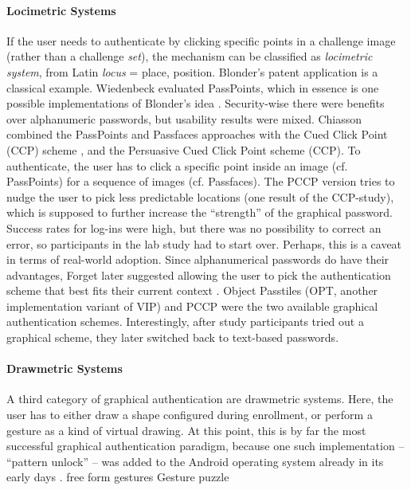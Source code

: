 	\paragraph{Locimetric Systems}
	If the user needs to authenticate by clicking specific points in a challenge image (rather than a challenge \textit{set}), the mechanism can be classified as \textit{locimetric system}, from Latin \textit{locus} = place, position. Blonder's patent application \cite{Blonder1996PatentGraphicalPW} is a classical example. Wiedenbeck \etal evaluated PassPoints, which in essence is one possible implementations of Blonder's idea \cite{Wiedenbeck2005PassPoints}. Security-wise there were benefits over alphanumeric passwords, but usability results were mixed. Chiasson \etal combined the PassPoints and Passfaces approaches with the Cued Click Point (CCP) scheme \cite{Chiasson2007CCP}, and the Persuasive Cued Click Point scheme \cite{Chiasson2008PCCP} (CCP). To authenticate, the user has to click a specific point inside an image (cf. PassPoints) for a sequence of images (cf. Passfaces). The PCCP version tries to nudge the user to pick less predictable locations (one result of the CCP-study), which is supposed to further increase the ``strength'' of the graphical password. Success rates for log-ins were high, but there was no possibility to correct an error, so participants in the lab study had to start over. Perhaps, this is a caveat in terms of real-world adoption. Since alphanumerical passwords do have their advantages, Forget \etal later suggested allowing the user to pick the authentication scheme that best fits their current context \cite{Forget2015CYOA}. Object Passtiles (OPT, another implementation variant of VIP) and PCCP were the two available graphical authentication schemes. Interestingly, after study participants tried out a graphical scheme, they later switched back to text-based passwords. 
	
	\paragraph{Drawmetric Systems}
	A third category of graphical authentication are drawmetric systems. Here, the user has to either draw a shape configured during enrollment, or perform a gesture as a kind of virtual drawing. At this point, this is by far the most successful graphical authentication paradigm, because one such implementation -- ``pattern unlock'' -- was added to the Android operating system already in its early days \cite{Aviv2010SmudgeAttacks}.  
	free form gestures \cite{Sherman2014UserGeneratedGesturesAuth}
	Gesture puzzle \cite{Schloglhofer2012SecureAndUsableMobileAuth}


